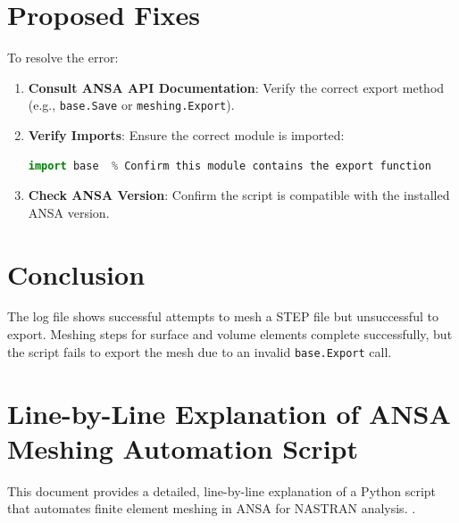 \documentclass{book}
\begin{document}
\begin{itemize}[leftmargin=*,label=\textbullet]
\section{Proposed Fixes}
To resolve the error:
\begin{enumerate}
    \item \textbf{Consult ANSA API Documentation}: Verify the correct export method (e.g., \texttt{base.Save} or \texttt{meshing.Export}).
    \item \textbf{Verify Imports}: Ensure the correct module is imported:
    \begin{lstlisting}[language=Python]
import base  % Confirm this module contains the export function
    \end{lstlisting}
    \item \textbf{Check ANSA Version}: Confirm the script is compatible with the installed ANSA version.
\end{enumerate}

\section{Conclusion}
The log file shows successful attempts to mesh a STEP file but unsuccessful to export. Meshing steps for surface and volume elements complete successfully, but the script fails to export the mesh due to an invalid \texttt{base.Export} call. 

\section*{Line-by-Line Explanation of ANSA Meshing Automation Script}
This document provides a detailed, line-by-line explanation of a Python script that automates finite element meshing in ANSA for NASTRAN analysis. .


\end{itemize}
\end{document}
